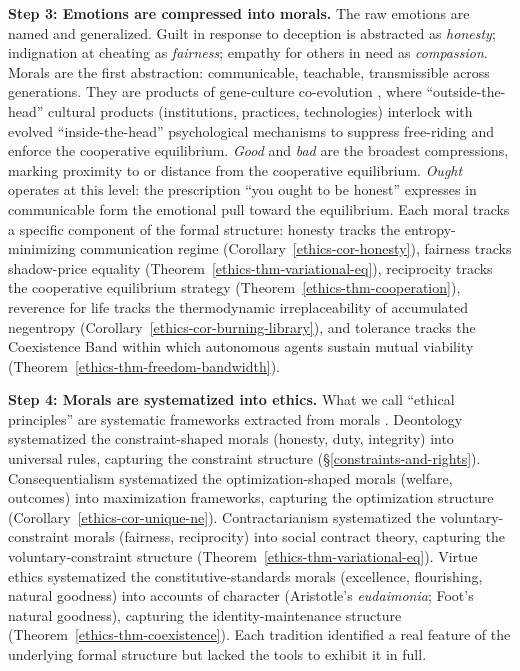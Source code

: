 \documentclass[11pt]{article}
\theoremstyle{plain}
\theoremstyle{definition}
\theoremstyle{remark}
\begin{document}
\textbf{Step 3: Emotions are compressed into morals.} The raw emotions
are named and generalized. Guilt in response to deception is abstracted
as \emph{honesty}; indignation at cheating as \emph{fairness}; empathy
for others in need as \emph{compassion}. Morals are the first
abstraction: communicable, teachable, transmissible across generations.
They are products of gene-culture co-evolution
\citep{BoydRicherson1985, Henrich2015SOS}, where ``outside-the-head''
cultural products (institutions, practices, technologies) interlock with
evolved ``inside-the-head'' psychological mechanisms to suppress
free-riding \citep{Haidt2010} and enforce the cooperative equilibrium.
\emph{Good} and \emph{bad} are the broadest compressions, marking
proximity to or distance from the cooperative equilibrium. \emph{Ought}
operates at this level: the prescription ``you ought to be honest''
expresses in communicable form the emotional pull toward the
equilibrium. Each moral tracks a specific component of the formal
structure: honesty tracks the entropy-minimizing communication regime
(Corollary~\ref{ethics-cor-honesty}), fairness tracks shadow-price
equality (Theorem~\ref{ethics-thm-variational-eq}), reciprocity tracks
the cooperative equilibrium strategy
(Theorem~\ref{ethics-thm-cooperation}), reverence for life tracks the
thermodynamic irreplaceability of accumulated negentropy
(Corollary~\ref{ethics-cor-burning-library}), and tolerance tracks the
Coexistence Band within which autonomous agents sustain mutual viability
(Theorem~\ref{ethics-thm-freedom-bandwidth}).

\textbf{Step 4: Morals are systematized into ethics.} What we call
``ethical principles'' are systematic frameworks extracted from morals
\citep{Rawls1971, Haidt2012}. Deontology systematized the
constraint-shaped morals (honesty, duty, integrity) into universal
rules, capturing the constraint structure
(§\ref{constraints-and-rights}). Consequentialism systematized the
optimization-shaped morals (welfare, outcomes) into maximization
frameworks, capturing the optimization structure
(Corollary~\ref{ethics-cor-unique-ne}). Contractarianism systematized
the voluntary-constraint morals (fairness, reciprocity) into social
contract theory, capturing the voluntary-constraint structure
(Theorem~\ref{ethics-thm-variational-eq}). Virtue ethics systematized
the constitutive-standards morals (excellence, flourishing, natural
goodness) into accounts of character (Aristotle's \emph{eudaimonia};
Foot's natural goodness), capturing the identity-maintenance structure
(Theorem~\ref{ethics-thm-coexistence}). Each tradition identified a real
feature of the underlying formal structure but lacked the tools to
exhibit it in full.
\end{document}
